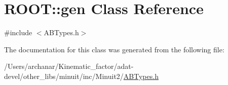 \hypertarget{classROOT_1_1Minuit2_1_1gen}{}\section{R\+O\+OT\+:\+:gen Class Reference}
\label{classROOT_1_1Minuit2_1_1gen}


{\ttfamily \#include $<$A\+B\+Types.\+h$>$}



The documentation for this class was generated from the following file\+:\begin{DoxyCompactItemize}
\item 
/\+Users/archanar/\+Kinematic\+\_\+factor/adat-\/devel/other\+\_\+libs/minuit/inc/\+Minuit2/\mbox{\hyperlink{adat-devel_2other__libs_2minuit_2inc_2Minuit2_2ABTypes_8h}{A\+B\+Types.\+h}}\end{DoxyCompactItemize}
